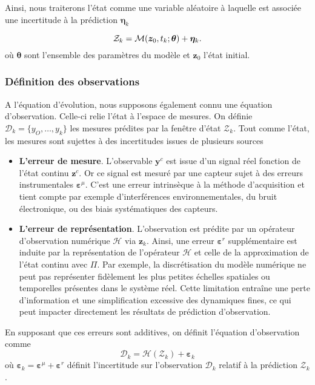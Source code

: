 Ainsi, nous traiterons l'état comme une variable aléatoire à laquelle est associée une incertitude à la prédiction $\bm \eta_k$

\begin{equation*}
    \mathcal Z_k = \mathcal{M}(\bm z_0, t_k ; \bm \theta) + \bm \eta_k.
\end{equation*}
où $\bm \theta$ sont l'ensemble des paramètres du modèle et $\bm z_0$ l'état initial.

\subsubsection{Définition des observations}
A l'équation d'évolution, nous supposons également connu une équation d'observation. Celle-ci relie l'état à l'espace de mesures. On définie $\mathcal{D}_k = \{y_O, \dots, y_k\}$ les mesures prédites par la fenêtre d'état $\mathcal{Z}_k$. Tout comme l'état, les mesures sont sujettes à des incertitudes issues de plusieurs sources

\begin{itemize}
    \item \textbf{L'erreur de mesure}. L'observable $\bm y^c$ est issue d'un signal réel fonction de l'état continu $\bm z^c$. Or ce signal est mesuré par une capteur sujet à des erreurs instrumentales $\bm \varepsilon^{\mu}$. C'est une erreur intrinsèque à la méthode d'acquisition et tient compte par exemple d'interférences environnementales, du bruit électronique, ou des biais systématiques des capteurs.
    \item \textbf{L'erreur de représentation}. L'observation est prédite par un opérateur d'observation numérique $\mathcal H$ via $\bm z_k$. Ainsi, une erreur $\bm{\varepsilon}^r$ supplémentaire est induite par la représentation de l'opérateur $\mathcal H$ et celle de la approximation de l'état continu avec $\Pi$. Par exemple, la discrétisation du modèle numérique ne peut pas représenter fidèlement les plus petites échelles spatiales ou temporelles présentes dans le système réel. Cette limitation entraîne une perte d'information et une simplification excessive des dynamiques fines, ce qui peut impacter directement les résultats de prédiction d'observation.
\end{itemize}

En supposant que ces erreurs sont additives, on définit l'équation d'observation comme
\begin{equation*}
    \mathcal D_k = \mathcal H (\mathcal{Z}_k) + \bm{\varepsilon}_k
\end{equation*} où $\bm{\varepsilon}_k = \bm{\varepsilon}^\mu  + \bm{\varepsilon}^r$ définit l'incertitude sur l'observation $\mathcal D_k$ relatif à la prédiction $\mathcal{Z}_k$.

